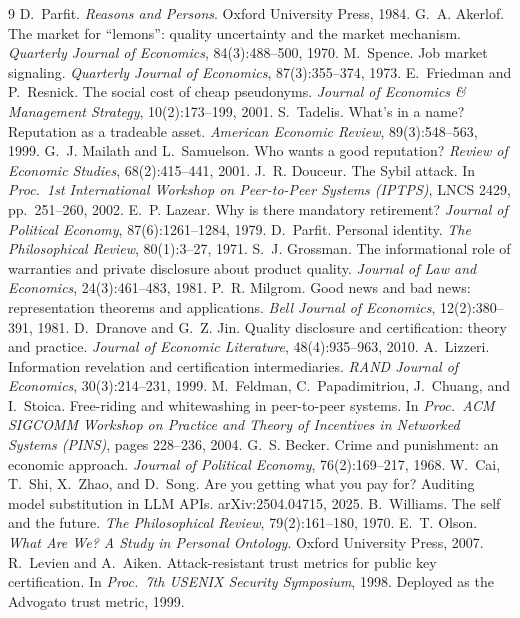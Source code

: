 \documentclass[11pt,a4paper]{article}
\begin{document}
\begin{thebibliography}{9}
 D.~Parfit. \emph{Reasons and Persons}. Oxford University Press, 1984.
 G.~A. Akerlof. The market for ``lemons'': quality uncertainty and the market mechanism. \emph{Quarterly Journal
of Economics}, 84(3):488--500, 1970.
 M.~Spence. Job market signaling. \emph{Quarterly Journal of Economics}, 87(3):355--374, 1973.
 E.~Friedman and P.~Resnick. The social cost of cheap pseudonyms. \emph{Journal of Economics \&
Management Strategy}, 10(2):173--199, 2001.
 S.~Tadelis. What's in a name? Reputation as a tradeable asset. \emph{American Economic Review}, 89(3):548--563,
1999.
 G.~J. Mailath and L.~Samuelson. Who wants a good reputation? \emph{Review of Economic Studies},
68(2):415--441, 2001.
 J.~R. Douceur. The Sybil attack. In \emph{Proc.\ 1st International Workshop on Peer-to-Peer Systems (IPTPS)},
LNCS 2429, pp.~251--260, 2002.
 E.~P. Lazear. Why is there mandatory retirement? \emph{Journal of Political Economy}, 87(6):1261--1284, 1979.
 D.~Parfit. Personal identity. \emph{The Philosophical Review}, 80(1):3--27, 1971.
 S.~J. Grossman. The informational role of warranties and private disclosure about product quality.
\emph{Journal of Law and Economics}, 24(3):461--483, 1981.
 P.~R. Milgrom. Good news and bad news: representation theorems and applications. \emph{Bell Journal of
Economics}, 12(2):380--391, 1981.
 D.~Dranove and G.~Z. Jin. Quality disclosure and certification: theory and practice. \emph{Journal of
Economic Literature}, 48(4):935--963, 2010.
 A.~Lizzeri. Information revelation and certification intermediaries. \emph{RAND Journal of Economics},
30(3):214--231, 1999.
 M.~Feldman, C.~Papadimitriou, J.~Chuang, and I.~Stoica. Free-riding and whitewashing in peer-to-peer
systems. In \emph{Proc.\ ACM SIGCOMM Workshop on Practice and Theory of Incentives in Networked Systems (PINS)}, pages
228--236, 2004.
 G.~S. Becker. Crime and punishment: an economic approach. \emph{Journal of Political Economy},
76(2):169--217, 1968.
 W.~Cai, T.~Shi, X.~Zhao, and D.~Song. Are you getting what you pay for? Auditing model substitution in LLM
APIs. arXiv:2504.04715, 2025.
 B.~Williams. The self and the future. \emph{The Philosophical Review}, 79(2):161--180, 1970.
 E.~T. Olson. \emph{What Are We? A Study in Personal Ontology}. Oxford University Press, 2007.
 R.~Levien and A.~Aiken. Attack-resistant trust metrics for public key certification. In \emph{Proc.\ 7th USENIX Security Symposium}, 1998. Deployed as the Advogato trust metric, 1999.
\end{thebibliography}
\end{document}
